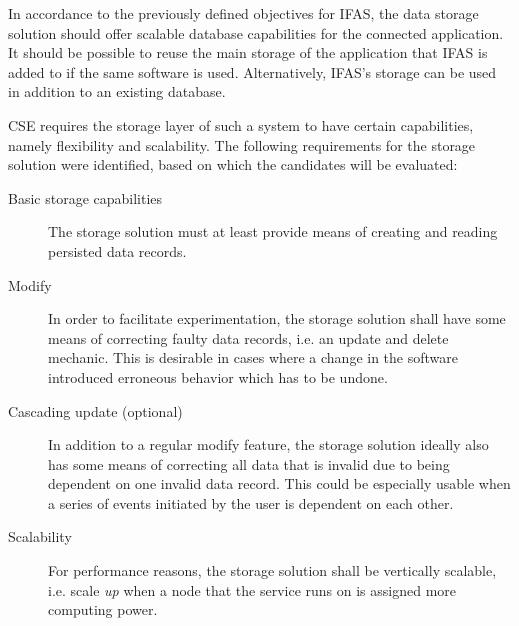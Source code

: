 In accordance to the previously defined objectives for \ac{IFAS}, the data storage solution should offer scalable database capabilities for the connected application.
It should be possible to reuse the main storage of the application that \ac{IFAS} is added to if the same software is used.
Alternatively, \ac{IFAS}'s storage can be used in addition to an existing database.

\ac{CSE} requires the storage layer of such a system to have certain capabilities, namely flexibility and scalability.
The following requirements for the storage solution were identified, based on which the candidates will be evaluated:

\begin{description}
\item [Basic storage capabilities]
The storage solution must at least provide means of creating and reading persisted data records.
\item [Modify]
In order to facilitate experimentation, the storage solution shall have some means of correcting faulty data records, i.e. an update and delete mechanic.
This is desirable in cases where a change in the software introduced erroneous behavior which has to be undone.
\item [Cascading update (optional)]
In addition to a regular modify feature, the storage solution ideally also has some means of correcting all data that is invalid due to being dependent on one invalid data record.
This could be especially usable when a series of events initiated by the user is dependent on each other.
\item [Scalability]
For performance reasons, the storage solution shall be vertically scalable, i.e. scale \emph{up} when a node that the service runs on is assigned more computing power.

\end{description}
